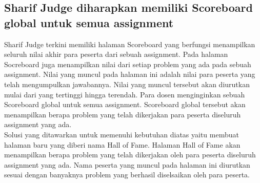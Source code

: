 \subsection{Sharif Judge diharapkan memiliki Scoreboard global untuk semua assignment}
Sharif Judge terkini memiliki halaman Scoreboard yang berfungsi menampilkan seluruh nilai akhir para peserta dari sebuah assignment. Pada halaman Socreboard juga menampilkan nilai dari setiap problem yang ada pada sebuah assignment. Nilai yang muncul pada halaman ini adalah nilai para peserta yang telah mengumpulkan jawabannya. Nilai yang muncul tersebut akan diurutkan mulai dari yang tertinggi hingga terendah. Para dosen menginginkan sebuah Scoreboard global untuk semua assignment. Scoreboard global tersebut akan menampilkan berapa problem yang telah dikerjakan para peserta diseluruh assignment yang ada. \\
Solusi yang ditawarkan untuk memenuhi kebutuhan diatas yaitu membuat halaman baru yang diberi nama Hall of Fame. Halaman Hall of Fame akan menampilkan berapa problem yang telah dikerjakan oleh para peserta diseluruh assignment yang ada. Nama peserta yang muncul pada halaman ini diurutkan sesuai dengan banyaknya problem yang berhasil diselsaikan oleh para peserta.